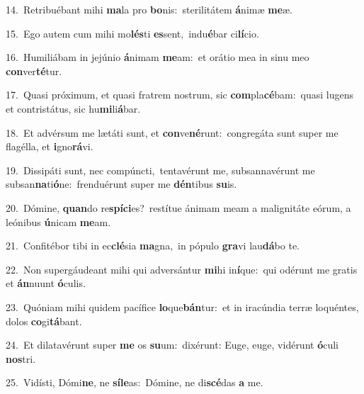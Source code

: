 {\numbfont\textcolor{\numbcolor}{14.}}~Retribuébant mihi \textbf{ma}\-la pro \textbf{bo}\-nis:~\star sterilitátem \textbf{á}\-nimæ \textbf{me}\-æ.\par
{\numbfont\textcolor{\numbcolor}{15.}}~Ego autem cum mihi mo\-\textbf{lés}\-ti \textbf{es}\-sent,~\star indu\-\textbf{é}\-bar ci\-\textbf{lí}\-cio.\par
{\numbfont\textcolor{\numbcolor}{16.}}~Humiliábam in jejúnio \textbf{á}\-nimam \textbf{me}\-am:~\star et orátio mea in sinu meo \textbf{con}\-ver\-\textbf{té}\-tur.\par
{\numbfont\textcolor{\numbcolor}{17.}}~Quasi próximum, et quasi fratrem nostrum, sic \textbf{com}\-pla\-\textbf{cé}\-bam:~\star quasi lugens et contristátus, sic hu\-\textbf{mi}\-li\-\textbf{á}\-bar.\par
{\numbfont\textcolor{\numbcolor}{18.}}~Et advérsum me lætáti sunt, et \textbf{con}\-ve\-\textbf{né}\-runt:~\star congregáta sunt super me flagélla, et \textbf{i}\-gno\-\textbf{rá}\-vi.\par
{\numbfont\textcolor{\numbcolor}{19.}}~Dissipáti sunt, nec compúncti,~\dagger tentavérunt me, subsannavérunt me subsan\-\textbf{na}\-ti\-\textbf{ó}\-ne:~\star frenduérunt super me \textbf{dén}\-tibus \textbf{su}\-is.\par
{\numbfont\textcolor{\numbcolor}{20.}}~Dómine, \textbf{quan}\-do re\-\textbf{spí}\-\textbf{ci}es?~\star restítue ánimam meam a malignitáte eórum, a leónibus \textbf{ú}\-nicam \textbf{me}\-am.\par
{\numbfont\textcolor{\numbcolor}{21.}}~Confitébor tibi in ec\-\textbf{clé}\-sia \textbf{ma}\-gna,~\star in pópulo \textbf{gra}\-vi lau\-\textbf{dá}\-bo te.\par
{\numbfont\textcolor{\numbcolor}{22.}}~Non supergáudeant mihi qui adversántur \textbf{mi}\-hi in\-\textbf{í}\-que:~\star qui odérunt me gratis et \textbf{án}\-nuunt \textbf{ó}\-culis.\par
{\numbfont\textcolor{\numbcolor}{23.}}~Quóniam mihi quidem pacífice \textbf{lo}\-que\-\textbf{bán}\-tur:~\star et in iracúndia terræ loquéntes, dolos \textbf{co}\-gi\-\textbf{tá}\-bant.\par
{\numbfont\textcolor{\numbcolor}{24.}}~Et dilatavérunt super \textbf{me} os \textbf{su}\-um:~\star dixérunt: Euge, euge, vidérunt \textbf{ó}\-culi \textbf{nos}\-tri.\par
{\numbfont\textcolor{\numbcolor}{25.}}~Vidísti, Dómi\-\textbf{ne}\-, ne \textbf{sí}\-\textbf{le}as:~\star Dómine, ne di\-\textbf{scé}\-das \textbf{a} me.\par

